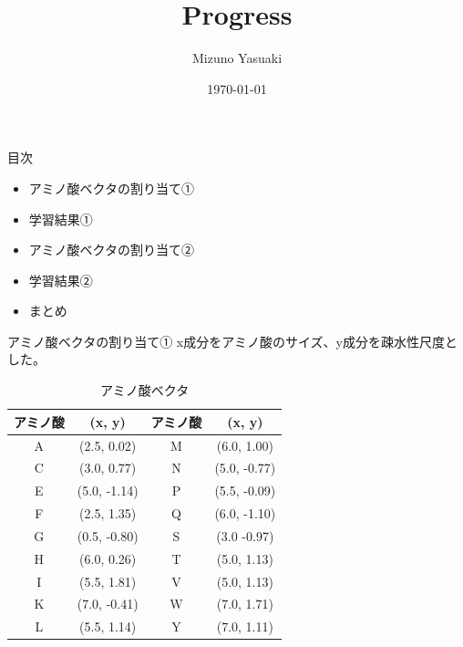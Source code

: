\documentclass[dvipdfmx]{beamer}
\title{Progress}
\date{\today}
\author{Mizuno Yasuaki}
\begin{document}
  \maketitle
  
  \begin{frame}{目次}
    \begin{itemize}
      \item アミノ酸ベクタの割り当て①
      \item 学習結果①
      \item アミノ酸ベクタの割り当て②
      \item 学習結果②
      \item まとめ
    \end{itemize}
  \end{frame}

  \begin{frame}{アミノ酸ベクタの割り当て①}
    x成分をアミノ酸のサイズ、y成分を疎水性尺度とした。
    \begin{table}[H]
      \centering
      \caption{アミノ酸ベクタ}
      \label{tab:amino_vector_1}
      \begin{tabular}{cccc}
        \hline
        アミノ酸 & (x, y) & アミノ酸 & (x, y) \\
        \hline \hline
        A & (2.5, 0.02) & M & (6.0, 1.00) \\
        C & (3.0, 0.77) & N & (5.0, -0.77) \\
        E & (5.0, -1.14) & P & (5.5, -0.09) \\
        F & (2.5, 1.35) & Q & (6.0, -1.10) \\
        G & (0.5, -0.80) & S & (3.0 -0.97) \\
        H & (6.0, 0.26) & T & (5.0, 1.13) \\
        I & (5.5, 1.81) & V & (5.0, 1.13) \\
        K & (7.0, -0.41) & W & (7.0, 1.71) \\
        L & (5.5, 1.14) & Y & (7.0, 1.11) \\
        \hline
      \end{tabular}
    \end{table}
  \end{frame}
\end{document}
